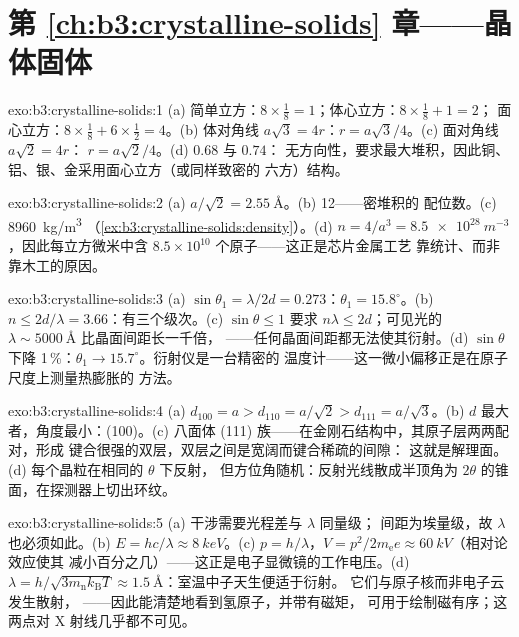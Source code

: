 \section*{第 \ref{ch:b3:crystalline-solids} 章——晶体固体}

\begin{solution}{exo:b3:crystalline-solids:1}
(a) 简单立方：$8\times\tfrac18 = 1$；体心立方：$8\times\tfrac18 + 1 = 2$；
面心立方：$8\times\tfrac18 + 6\times\tfrac12 = 4$。(b) 体对角线
$a\sqrt3 = 4r$：$r = a\sqrt3/4$。(c) 面对角线 $a\sqrt2 = 4r$：
$r = a\sqrt2/4$。(d) $0.68$ 与 $0.74$：
无方向性，要求最大堆积，因此铜、铝、银、金采用面心立方（或同样致密的
六方）结构。
\end{solution}

\begin{solution}{exo:b3:crystalline-solids:2}
(a) $a/\sqrt2 = \qty{2.55}{\angstrom}$。(b) 12——密堆积的
配位数。(c) \qty{8960}{kg/m^3}
（\cref{ex:b3:crystalline-solids:density}）。(d) $n = 4/a^3 =
\qty{8.5e28}{m^{-3}}$，因此每立方微米中含
$8.5\times10^{10}$ 个原子——这正是芯片金属工艺
靠统计、而非靠木工的原因。
\end{solution}

\begin{solution}{exo:b3:crystalline-solids:3}
(a) $\sin\theta_1 = \lambda/2d = 0.273$：$\theta_1 =
15.8^\circ$。(b) $n \le 2d/\lambda = 3.66$：有三个级次。(c)
$\sin\theta \le 1$ 要求 $n\lambda \le 2d$；可见光的
$\lambda \sim \qty{5000}{\angstrom}$ 比晶面间距长一千倍，
——任何晶面间距都无法使其衍射。(d) $\sin\theta$
下降 1\,\%：$\theta_1 \to 15.7^\circ$。衍射仪是一台精密的
温度计——这一微小偏移正是在原子尺度上测量热膨胀的
方法。
\end{solution}

\begin{solution}{exo:b3:crystalline-solids:4}
(a) $d_{100} = a > d_{110} = a/\sqrt2 > d_{111} = a/\sqrt3$。(b)
$d$ 最大者，角度最小：(100)。(c) 八面体
(111) 族——在金刚石结构中，其原子层两两配对，形成
键合很强的双层，双层之间是宽阔而键合稀疏的间隙：
这就是解理面。(d) 每个晶粒在相同的 $\theta$ 下反射，
但方位角随机：反射光线散成半顶角为
$2\theta$ 的锥面，在探测器上切出环纹。
\end{solution}

\begin{solution}{exo:b3:crystalline-solids:5}
(a) 干涉需要光程差与 $\lambda$ 同量级；
间距为埃量级，故 $\lambda$ 也必须如此。(b) $E =
hc/\lambda \approx \qty{8}{keV}$。(c) $p = h/\lambda$，$V =
p^2/2m_{\text{e}}e \approx \qty{60}{kV}$（相对论效应使其
减小百分之几）——这正是电子显微镜的工作电压。(d)
$\lambda = h/\sqrt{3m_{\text{n}}k_{\text{B}}T} \approx
\qty{1.5}{\angstrom}$：室温中子天生便适于衍射。
它们与原子核而非电子云发生散射，
——因此能清楚地看到氢原子，并带有磁矩，
可用于绘制磁有序；这两点对 X 射线几乎都不可见。
\end{solution}

